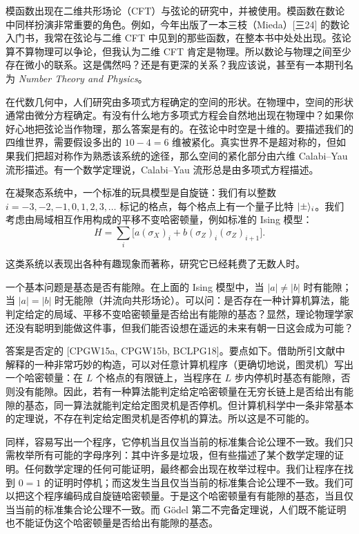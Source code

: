 模函数出现在二维共形场论（CFT）与弦论的研究中，并被使用。模函数在数论中同样扮演非常重要的角色。例如，今年出版了一本三枝（Mieda）[三24] 的数论入门书，我常在弦论与二维 CFT 中见到的那些函数，在整本书中处处出现。弦论算不算物理可以争论，但我认为二维 CFT 肯定是物理。所以数论与物理之间至少存在微小的联系。这是偶然吗？还是有更深的关系？我应该说，甚至有一本期刊名为 \textit{Number Theory and Physics}。

在代数几何中，人们研究由多项式方程确定的空间的形状。在物理中，空间的形状通常由微分方程确定。有没有什么地方多项式方程会自然地出现在物理中？如果你好心地把弦论当作物理，那么答案是有的。在弦论中时空是十维的。要描述我们的四维世界，需要假设多出的 $10-4=6$ 维被紧化。真实世界不是超对称的，但如果我们把超对称作为熟悉该系统的途径，那么空间的紧化部分由六维 Calabi--Yau 流形描述。有一个数学定理说，Calabi--Yau 流形总是由多项式方程描述。

在凝聚态系统中，一个标准的玩具模型是自旋链：我们有以整数 $i=-3,-2,-1,0,1,2,3,\dots$ 标记的格点，每个格点上有一个量子比特 $|\pm\rangle_i$。我们考虑由局域相互作用构成的平移不变哈密顿量，例如标准的 Ising 模型：
\[
  H=\sum_i\bigl[a(\sigma_X)_i+b(\sigma_Z)_i(\sigma_Z)_{i+1}\bigr].
  \tag{1.2}
\]

这类系统以表现出各种有趣现象而著称，研究它已经耗费了无数人时。

一个基本问题是基态是否有能隙。在上面的 Ising 模型中，当 $|a|\neq|b|$ 时有能隙；当 $|a|=|b|$ 时无能隙（并流向共形场论）。可以问：是否存在一种计算机算法，能判定给定的局域、平移不变哈密顿量是否给出有能隙的基态？显然，理论物理学家还没有聪明到能做这件事，但我们能否设想在遥远的未来有朝一日这会成为可能？

答案是否定的 [CPGW15a, CPGW15b, BCLPG18]。要点如下。借助所引文献中解释的一种非常巧妙的构造，可以对任意计算机程序（更确切地说，图灵机）写出一个哈密顿量：在 $L$ 个格点的有限链上，当程序在 $L$ 步内停机时基态有能隙，否则没有能隙。因此，若有一种算法能判定给定哈密顿量在无穷长链上是否给出有能隙的基态，同一算法就能判定给定图灵机是否停机。但计算机科学中一条非常基本的定理说，不存在判定给定图灵机是否停机的算法。所以这是不可能的。

同样，容易写出一个程序，它停机当且仅当当前的标准集合论公理不一致。我们只需枚举所有可能的字母序列：其中许多是垃圾，但有些描述了某个数学定理的证明。任何数学定理的任何可能证明，最终都会出现在枚举过程中。我们让程序在找到 $0=1$ 的证明时停机；而这发生当且仅当当前的标准集合论公理不一致。我们可以把这个程序编码成自旋链哈密顿量。于是这个哈密顿量有有能隙的基态，当且仅当当前的标准集合论公理不一致。而 Gödel 第二不完备定理说，人们既不能证明也不能证伪这个哈密顿量是否给出有能隙的基态。


